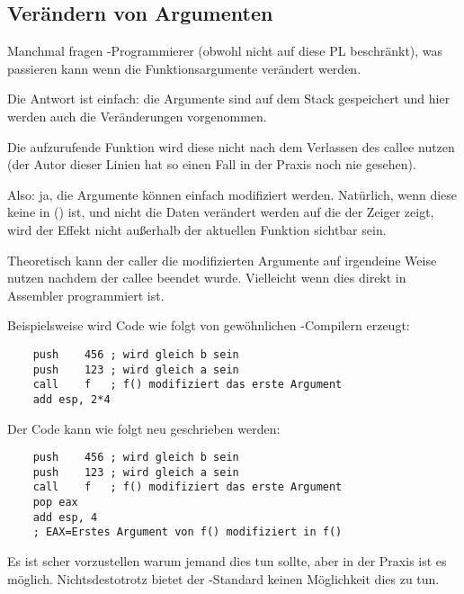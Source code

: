 \subsection{Verändern von Argumenten}

Manchmal fragen \CCpp{}-Programmierer (obwohl nicht auf diese \ac{PL} beschränkt),
was passieren kann wenn die Funktionsargumente verändert werden.

Die Antwort ist einfach: die Argumente sind auf dem Stack gespeichert und hier
werden auch die Veränderungen vorgenommen.

Die aufzurufende Funktion wird diese nicht nach dem Verlassen des \gls{callee}
nutzen (der Autor dieser Linien hat so einen Fall in der Praxis noch nie gesehen).



%



Also: ja, die Argumente können einfach modifiziert werden.
Natürlich, wenn diese keine  in  \Cpp{} () ist,
und nicht die Daten verändert werden auf die der Zeiger zeigt, wird der Effekt nicht
außerhalb der aktuellen Funktion sichtbar sein.

Theoretisch kann der \gls{caller} die modifizierten Argumente auf irgendeine Weise
nutzen nachdem der \gls{callee} beendet wurde.
Vielleicht wenn dies direkt in Assembler programmiert ist.

Beispielsweise wird Code wie folgt von gewöhnlichen \CCpp-Compilern erzeugt:

\begin{lstlisting}
	push	456	; wird gleich b sein
	push	123	; wird gleich a sein
	call	f	; f() modifiziert das erste Argument
	add	esp, 2*4
\end{lstlisting}

Der Code kann wie folgt neu geschrieben werden:

\begin{lstlisting}
	push	456	; wird gleich b sein
	push	123	; wird gleich a sein
	call	f	; f() modifiziert das erste Argument
	pop	eax
	add	esp, 4
	; EAX=Erstes Argument von f() modifiziert in f()
\end{lstlisting}

Es ist scher vorzustellen warum jemand dies tun sollte, aber in der Praxis ist es möglich.
Nichtsdestotrotz bietet der \CCpp-Standard keinen Möglichkeit dies zu tun.


